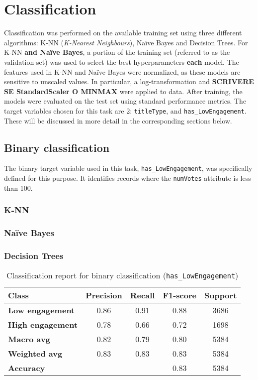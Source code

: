 
\chapter{Classification}
\label{ch:capitolo3}
Classification was performed on the available training set using three different algorithms: K-NN (\textit{K-Nearest Neighbours}), Naïve Bayes and Decision Trees.
For K-NN \textbf{and Naïve Bayes}, a portion of the training set (referred to as the validation set) was used to select the best hyperparameters \textbf{each} model.
The features used in K-NN and Naïve Bayes were normalized, as these models are sensitive to unscaled values.
In particular, a log-transformation and \textbf{SCRIVERE SE StandardScaler O MINMAX} were applied to data.
After training, the models were evaluated on the test set using standard performance metrics. 
The target variables chosen for this task are 2: \texttt{titleType}, and \texttt{has\_LowEngagement}.
These will be discussed in more detail in the corresponding sections below.

\section{Binary classification}\label{sec:binary_classification}
The binary target variable used in this task, \texttt{has\_LowEngagement}, was specifically defined for this purpose. 
It identifies records where the \texttt{numVotes} attribute is less than 100.
\subsection*{K-NN}
\subsection*{Naïve Bayes}
\subsection*{Decision Trees}
\begin{table}[H]
    \centering
    \begin{tabular}{lcccc}
        \toprule
        \bf{Class} & \bf{Precision} & \bf{Recall} & \bf{F1-score} & \bf{Support} \\
        \midrule
        \bf{Low engagement} & 0.86 & 0.91 & 0.88 & 3686 \\
        \bf{High engagement} & 0.78 & 0.66 & 0.72 & 1698 \\
        \midrule
        \bf{Macro avg} & 0.82 & 0.79 & 0.80 & 5384 \\
        \bf{Weighted avg} & 0.83 & 0.83 & 0.83 & 5384 \\
        \midrule
        \bf{Accuracy}  &  &  & 0.83 & 5384 \\
        \bottomrule
    \end{tabular}
    \caption{Classification report for binary classification (\texttt{has\_LowEngagement})}
    \label{tab:binary_classification_report}
\end{table}


